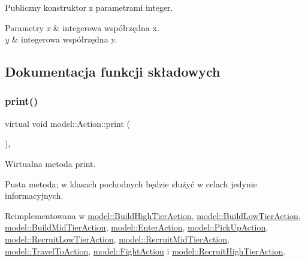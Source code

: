 Publiczny konstruktor z parametrami integer. 


\begin{DoxyParams}{Parametry}
{\em x} & integerowa współrzędna x. \\
\hline
{\em y} & integerowa współrzędna y. \\
\hline
\end{DoxyParams}


\subsection{Dokumentacja funkcji składowych}
\mbox{\label{classmodel_1_1Action_a2955dbb4a69e38a48aa07d730fe2d77c}} 
\subsubsection{\texorpdfstring{print()}{print()}}
{\footnotesize\ttfamily virtual void model\+::\+Action\+::print (\begin{DoxyParamCaption}{ }\end{DoxyParamCaption})\hspace{0.3cm}{\ttfamily [inline]}, {\ttfamily [virtual]}}



Wirtualna metoda print. 

Pusta metoda; w klasach pochodnych będzie służyć w celach jedynie informacyjnych. 

Reimplementowana w \hyperlink{classmodel_1_1BuildHighTierAction_a587f7c8efb015bbc00cb706e7e289edf}{model\+::\+Build\+High\+Tier\+Action}, \hyperlink{classmodel_1_1BuildLowTierAction_a0917c29053656d5914125a30bcd51cce}{model\+::\+Build\+Low\+Tier\+Action}, \hyperlink{classmodel_1_1BuildMidTierAction_abec06b6ae68325996228e9b36c9d05d3}{model\+::\+Build\+Mid\+Tier\+Action}, \hyperlink{classmodel_1_1EnterAction_a0e6f49b42a1c026c421f29193670abeb}{model\+::\+Enter\+Action}, \hyperlink{classmodel_1_1PickUpAction_a8e3d6499d8eb1f99566e0b5b3e6661c9}{model\+::\+Pick\+Up\+Action}, \hyperlink{classmodel_1_1RecruitLowTierAction_ac05d2ba4872e6b06bf3a218661a4abdc}{model\+::\+Recruit\+Low\+Tier\+Action}, \hyperlink{classmodel_1_1RecruitMidTierAction_a91d571781540c34eea70643518e4a33d}{model\+::\+Recruit\+Mid\+Tier\+Action}, \hyperlink{classmodel_1_1TravelToAction_accc5a7f3bf4d65e22d5d7d86624a8da1}{model\+::\+Travel\+To\+Action}, \hyperlink{classmodel_1_1FightAction_a416846e68a9aa998412da4d439dbc6cc}{model\+::\+Fight\+Action} i \hyperlink{classmodel_1_1RecruitHighTierAction_a0bedf8fdec991eff26a3eb9ffa5e552f}{model\+::\+Recruit\+High\+Tier\+Action}.



